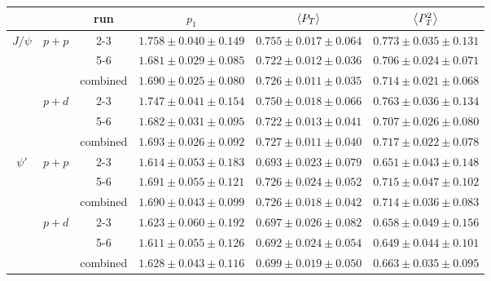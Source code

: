 \begin{tabular}{ccc|c|c|c}
\hline
                      &                                             & run      & $p_1$                   & $\expval{P_T}$          & $\expval{P^2_T}$        \\ \hline
\multicolumn{1}{c|}{\multirow{6}{*}{$J/\psi$}} &
  \multicolumn{1}{c|}{\multirow{3}{*}{$p+p$}} &
  2-3 &
  $1.758\pm0.040\pm0.149$ &
  $0.755\pm0.017\pm0.064$ &
  $0.773\pm0.035\pm0.131$ \\ \cline{3-6} 
\multicolumn{1}{c|}{} & \multicolumn{1}{c|}{}                       & 5-6      & $1.681\pm0.029\pm0.085$ & $0.722\pm0.012\pm0.036$ & $0.706\pm0.024\pm0.071$ \\ \cline{3-6} 
\multicolumn{1}{c|}{} & \multicolumn{1}{c|}{}                       & combined & $1.690\pm0.025\pm0.080$ & $0.726\pm0.011\pm0.035$ & $0.714\pm0.021\pm0.068$ \\ \cline{2-6} 
\multicolumn{1}{c|}{} & \multicolumn{1}{c|}{\multirow{3}{*}{$p+d$}} & 2-3      & $1.747\pm0.041\pm0.154$ & $0.750\pm0.018\pm0.066$ & $0.763\pm0.036\pm0.134$ \\ \cline{3-6} 
\multicolumn{1}{c|}{} & \multicolumn{1}{c|}{}                       & 5-6      & $1.682\pm0.031\pm0.095$ & $0.722\pm0.013\pm0.041$ & $0.707\pm0.026\pm0.080$ \\ \cline{3-6} 
\multicolumn{1}{c|}{} & \multicolumn{1}{c|}{}                       & combined & $1.693\pm0.026\pm0.092$ & $0.727\pm0.011\pm0.040$ & $0.717\pm0.022\pm0.078$ \\ \hline
\multicolumn{1}{c|}{\multirow{6}{*}{$\psi'$}} &
  \multicolumn{1}{c|}{\multirow{3}{*}{$p+p$}} &
  2-3 &
  $1.614\pm0.053\pm0.183$ &
  $0.693\pm0.023\pm0.079$ &
  $0.651\pm0.043\pm0.148$ \\ \cline{3-6} 
\multicolumn{1}{c|}{} & \multicolumn{1}{c|}{}                       & 5-6      & $1.691\pm0.055\pm0.121$ & $0.726\pm0.024\pm0.052$ & $0.715\pm0.047\pm0.102$ \\ \cline{3-6} 
\multicolumn{1}{c|}{} & \multicolumn{1}{c|}{}                       & combined & $1.690\pm0.043\pm0.099$ & $0.726\pm0.018\pm0.042$ & $0.714\pm0.036\pm0.083$ \\ \cline{2-6} 
\multicolumn{1}{c|}{} & \multicolumn{1}{c|}{\multirow{3}{*}{$p+d$}} & 2-3      & $1.623\pm0.060\pm0.192$ & $0.697\pm0.026\pm0.082$ & $0.658\pm0.049\pm0.156$ \\ \cline{3-6} 
\multicolumn{1}{c|}{} & \multicolumn{1}{c|}{}                       & 5-6      & $1.611\pm0.055\pm0.126$ & $0.692\pm0.024\pm0.054$ & $0.649\pm0.044\pm0.101$ \\ \cline{3-6} 
\multicolumn{1}{c|}{} & \multicolumn{1}{c|}{}                       & combined & $1.628\pm0.043\pm0.116$ & $0.699\pm0.019\pm0.050$ & $0.663\pm0.035\pm0.095$ \\ \hline
\end{tabular}